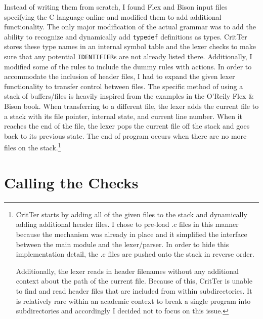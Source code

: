 \documentclass[12pt]{report}
\newcommand{\programName}{CritTer\xspace}
\begin{document}
Instead of writing them from scratch, I found Flex and Bison input files specifying the C language
online\cite{originalGrammar} and modified them to add additional functionality. The only major 
modification of the actual grammar was to add the ability to recognize and dynamically add 
\lstinline{typedef} definitions as types. \programName stores these type names in an internal symbol 
table and the lexer checks to make sure that any potential \lstinline{IDENTIFIER}s are not already listed 
there. Additionally, I modified some of the rules to include the dummy rules with actions. In 
order to accommodate the inclusion of header files, I had to expand the given lexer functionality to 
transfer control between files. The specific method of using a stack of buffers\slash files is heavily 
inspired from the examples in the O'Reily Flex \& Bison book\cite{flex-and-bison}. When transferring to a 
different file, the lexer adds the current file to a stack with its file pointer, internal state, and current line 
number. When it reaches the end of the file, the lexer pops the current file off the stack and goes back 
to its previous state. The end of program occurs when there are no more files on the 
stack.\footnote{\programName starts by adding all of the given files to the stack and dynamically adding 
additional header files. I chose to pre-load .c files in this manner because the mechanism was already in 
place and it simplified the interface between the main module and the lexer\slash parser. In order to hide 
this implementation detail, the .c files are pushed onto the stack in reverse order.

Additionally, the lexer reads in header filenames without any additional context about the path of the 
current file. Because of this, \programName is unable to find and read header files that are included from 
within subdirectories. It is relatively rare within an academic context to break a single program into 
subdirectories and accordingly I decided not to focus on this issue.} 

\section{Calling the Checks}
\label{callingTheChecks}
\end{document}

